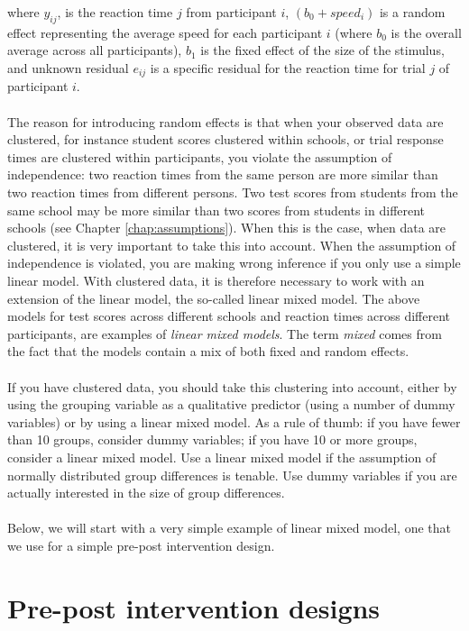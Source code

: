 \documentclass[]{book}\usepackage[]{graphicx}\usepackage[]{color}
\begin{document}
where $y_{ij}$, is the reaction time $j$ from participant $i$, $(b_0 + speed_i)$ is a random effect representing the average speed for each participant $i$ (where $b_0$ is the overall average across all participants), $b_1$ is the fixed effect of the size of the stimulus, and unknown residual $e_{ij}$ is a specific residual for the reaction time for trial $j$ of participant $i$.
\\
\\
The reason for introducing random effects is that when your observed data are clustered, for instance student scores clustered within schools, or trial response times are clustered within participants, you violate the assumption of independence: two reaction times from the same person are more similar than two reaction times from different persons. Two test scores from students from the same school may be more similar than two scores from students in different schools (see Chapter \ref{chap:assumptions}). When this is the case, when data are clustered, it is very important to take this into account. When the assumption of independence is violated, you are making wrong inference if you only use a simple linear model. With clustered data, it is therefore necessary to work with an extension of the linear model, the so-called linear mixed model. The above models for test scores across different schools and reaction times across different participants, are examples of \textit{linear mixed models}. The term \textit{mixed} comes from the fact that the models contain a mix of both fixed and random effects. 
\\
\\
If you have clustered data, you should take this clustering into account, either by using the grouping variable as a qualitative predictor (using a number of dummy variables) or by using a linear mixed model. As a rule of thumb: if you have fewer than 10 groups, consider dummy variables; if you have 10 or more groups, consider a linear mixed model. Use a linear mixed model if the assumption of normally distributed group differences is tenable. Use dummy variables if you are actually interested in the size of group differences.
\\
\\
Below, we will start with a very simple example of linear mixed model, one that we use for a simple pre-post intervention design.



\section{Pre-post intervention designs}
\end{document}
